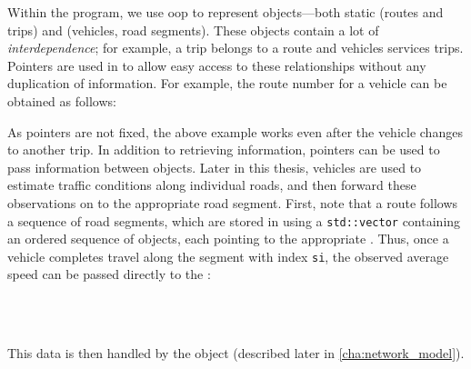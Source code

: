 Within the program, we use \gls{oop} to represent objects---both static (routes and trips) and \rt{} (vehicles, road segments). These objects contain a lot of \emph{interdependence}; for example, a trip belongs to a route and vehicles services trips. Pointers are used in \Cpp{} to allow easy access to these relationships without any duplication of information. For example, the route number for a vehicle can be obtained as follows:
\begin{knitrout}\small
{}\color{fgcolor}\begin{kframe}
\noindent
\ttfamily
{}\hlstd{}\hlstd{}\hlopt{(){-}$>$}\hlstd{}\hlstd{}\hlopt{(){-}$>$}\hlstd{}\hlstd{}\hlopt{();}\hlstd{}\hspace*{\fill}
\mbox{}
\normalfont
\end{kframe}
\end{knitrout}
As pointers are not fixed, the above example works even after the vehicle changes to another trip. In addition to retrieving information, pointers can be used to pass information between objects. Later in this thesis, vehicles are used to estimate traffic conditions along individual roads, and then forward these observations on to the appropriate road segment. First, note that a route follows a sequence of road segments, which are stored in \Cpp{} using a \verb+std::vector+ containing an ordered sequence of  objects, each pointing to the appropriate . Thus, once a vehicle completes travel along the segment with index \verb+si+, the observed average speed can be passed directly to the :
\begin{knitrout}\small
{}\color{fgcolor}\begin{kframe}
\noindent
\ttfamily
{}\hlstd{}\hlstd{}\hlopt{(){-}$>$}\hlstd{}\hlstd{}\hlopt{()}\hspace*{\fill}\\
\hlstd{}\hlstd{\ \ \ \ }\hlstd{}\hlopt{{-}$>$}\hlstd{}\hlstd{}\hlstd{}\hlstd{}\hlopt{(}\hlopt{){-}$>$}\hlstd{}\hlstd{}\hlopt{()}\hspace*{\fill}\\
\hlstd{}\hlstd{\ \ \ \ }\hlstd{}\hlopt{{-}$>$}\hlstd{}\hlstd{}\hlopt{(}\hlopt{,\ }\hlopt{);}\hlstd{}\hspace*{\fill}
\mbox{}
\normalfont
\end{kframe}
\end{knitrout}
\noindent
This data is then handled by the  object (described later in \cref{cha:network_model}).

